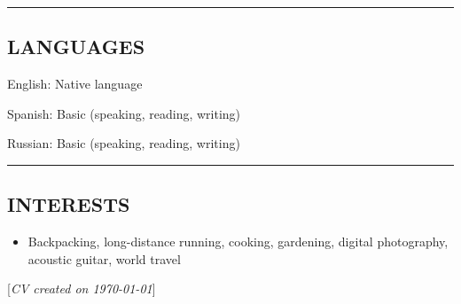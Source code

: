 \documentclass[10pt,letterpaper,MMMyyyy,nonstop]{simpleresumecv}
\newcommand{\CVNote}{CV created on {\today}}
\newenvironment{indentsection}[1]%
{\begin{list}{}%
    {\setlength{\leftmargin}{#1}}%
    \item[]%
}
{\end{list}}
\begin{document}


\hrule
\vspace{-0.4em}
\subsection*{LANGUAGES}

\begin{indentsection}{\parindent}
    \begin{description*}
        \item[English:]
        Native language
        \item[Spanish:]
        Basic (speaking, reading, writing)
        \item[Russian:]
        Basic (speaking, reading, writing)
    \end{description*}
\end{indentsection}





\hrule
\vspace{-0.4em}
\subsection*{INTERESTS}

\begin{itemize}
    \item Backpacking, long-distance running, cooking, gardening, digital photography, acoustic guitar, world travel
\end{itemize}



\null\hfill%
[\textit{\CVNote}]%
\hspace{2.0mm}\null
\end{document}
